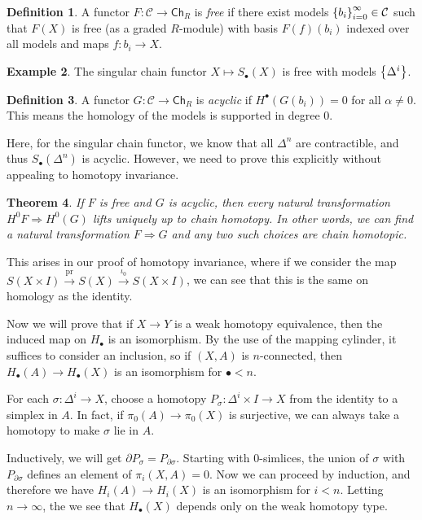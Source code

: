 \documentclass[leqno, openany]{memoir}
\newtheorem{thm}{Theorem}[section]
\theoremstyle{definition}
\newtheorem{defn}[thm]{Definition}
\newtheorem{exm}[thm]{Example}
\theoremstyle{remark}
\theoremstyle{plain}
\theoremstyle{definition}
\theoremstyle{remark}
\newcommand{\mc}[1]{\mathcal{#1}}
\newcommand{\mr}[1]{\mathrm{#1}}
\newcommand{\ms}[1]{\mathsf{#1}}
\begin{document}
\begin{defn}
    A functor $F \colon \mc{C} \to \ms{Ch}_R$ is \textit{free} if there exist models $\qty{b_i}_{i=0}^{\infty} \in \mc{C}$ such that $F(X)$ is free (as a graded $R$-module) with basis $F(f) (b_i)$ indexed over all models and maps $f \colon b_i \to X$.
\end{defn}

\begin{exm}
    The singular chain functor $X \mapsto S_{\bullet}(X)$ is free with models $\qty{\Delta^i}$.
\end{exm}

\begin{defn}
    A functor $G \colon \mc{C} \to \ms{Ch}_R$ is \textit{acyclic} if $H^{\bullet} (G(b_i)) = 0$ for all $\alpha \neq 0$. This means the homology of the models is supported in degree $0$.
\end{defn}

Here, for the singular chain functor, we know that all $\Delta^n$ are contractible, and thus $S_{\bullet}(\Delta^n)$ is acyclic. However, we need to prove this explicitly without appealing to homotopy invariance.

\begin{thm}
    If $F$ is free and $G$ is acyclic, then every natural transformation $H^0 F \Rightarrow H^0(G)$ lifts uniquely up to chain homotopy. In other words, we can find a natural transformation $F \Rightarrow G$ and any two such choices are chain homotopic.
\end{thm}

This arises in our proof of homotopy invariance, where if we consider the map $S(X \times I) \xrightarrow{\mr{pr}} S(X) \xrightarrow{\iota_0} S(X \times I)$, we can see that this is the same on homology as the identity.

Now we will prove that if $X \to Y$ is a weak homotopy equivalence, then the induced map on $H_{\bullet}$ is an isomorphism. By the use of the mapping cylinder, it suffices to consider an inclusion, so if $(X, A)$ is $n$-connected, then $H_{\bullet}(A) \to H_{\bullet}(X)$ is an isomorphism for $\bullet < n$.

For each $\sigma \colon \Delta^i \to X$, choose a homotopy $P_{\sigma} \colon \Delta^i \times I \to X$ from the identity to a simplex in $A$. In fact, if $\pi_0(A) \to \pi_0(X)$ is surjective, we can always take a homotopy to make $\sigma$ lie in $A$.

Inductively, we will get $\partial P_{\sigma} = P_{\partial \sigma}$. Starting with $0$-simlices, the union of $\sigma$ with $P_{\partial \sigma}$ defines an element of $\pi_i(X, A) = 0$. Now we can proceed by induction, and therefore we have $H_i(A) \to H_i(X)$ is an isomorphism for $i < n$. Letting $n \to \infty$, the we see that $H_{\bullet}(X)$ depends only on the weak homotopy type.
\end{document}
